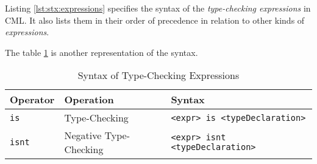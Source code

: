 Listing \ref{lst:stx:expressions} specifies the syntax of
the \emph{type-checking expressions} in CML.
It also lists them in their order of precedence
in relation to other kinds of \emph{expressions}.

The table \ref{tab:type-checking-syntax} is another representation of the syntax.

\begin{table}[H]
\centering
\begin{tabular}
{ l l l }
\hline
Operator & Operation & Syntax \\
\hline
\verb|is| & Type-Checking & \verb|<expr> is <typeDeclaration> | \\
\verb|isnt| & Negative Type-Checking & \verb|<expr> isnt <typeDeclaration>| \\
\end{tabular}
\caption{Syntax of Type-Checking Expressions}
\label{tab:type-checking-syntax}
\end{table}
